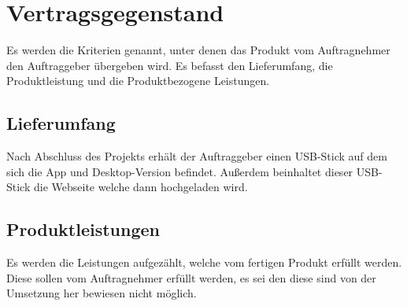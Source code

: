 \section{Vertragsgegenstand}
Es werden die Kriterien genannt, unter denen das Produkt vom Auftragnehmer den Auftraggeber übergeben wird. Es befasst den Lieferumfang, die Produktleistung und die Produktbezogene Leistungen. 
\subsection{Lieferumfang}
Nach Abschluss des Projekts erhält der Auftraggeber einen USB-Stick auf dem sich die App und Desktop-Version befindet. Außerdem beinhaltet dieser USB-Stick die Webseite welche dann hochgeladen wird.
\subsection{Produktleistungen}
Es werden die Leistungen aufgezählt, welche vom fertigen Produkt erfüllt werden. Diese sollen vom Auftragnehmer erfüllt werden, es sei den diese sind von der Umsetzung her bewiesen nicht möglich.
